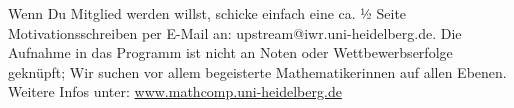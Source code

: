Wenn Du Mitglied werden willst, schicke einfach eine ca. ½ Seite
Motivationsschreiben per E-Mail an: upstream@iwr.uni-heidelberg.de. Die Aufnahme
in das Programm ist nicht an Noten oder Wettbewerbserfolge geknüpft; Wir suchen
vor allem begeisterte Mathematikerinnen auf allen Ebenen.  Weitere Infos unter:
\url{www.mathcomp.uni-heidelberg.de}

